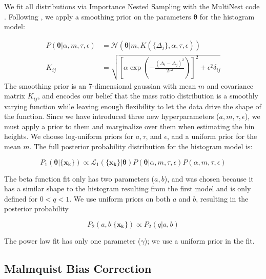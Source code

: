 \documentclass{emulateapj}
\renewcommand{\vec}[1]{\bm{#1}}
\DeclareMathOperator\erf{erf}
\begin{document}

We fit all distributions via Importance Nested Sampling with the MultiNest code \citep{multinest}. Following \citet{Foreman2014}, we apply a smoothing prior on the parameters $\vec{\theta}$ for the histogram model:

\begin{align}
P(\vec{\theta}| \alpha, m, \tau, \epsilon) &= \mathcal{N}(\vec{\theta} | m, K(\{\Delta_j\}, \alpha, \tau, \epsilon)) \\
K_{ij} &= \sqrt{\left[\alpha \exp{\left(-\frac{(\Delta_i - \Delta_j)^2}{2\tau^2}\right)}\right]^2 + \epsilon^2 \delta_{ij}}
\end{align}
The smoothing prior is an 7-dimensional gaussian with mean $m$ and covariance matrix $K_{ij}$, and encodes our belief that the mass ratio distribution is a smoothly varying function while leaving enough flexibility to let the data drive the shape of the function. Since we have introduced three new hyperparameters ($a, m, \tau, \epsilon$), we must apply a prior to them and marginalize over them when estimating the bin heights. We choose log-uniform priors for $a, \tau$, and $\epsilon$, and a uniform prior for the mean $m$. The full posterior probability distribution for the histogram model is:

\begin{equation}
P_1(\vec{\theta} | \{\vec{x_k}\}) \propto \mathcal{L}_1(\{\vec{x_k}\}| \vec{\theta}) P(\vec{\theta}| \alpha, m, \tau, \epsilon) P(\alpha, m, \tau, \epsilon)
\end{equation}

The beta function fit only has two parameters ($a, b$), and was chosen because it has a similar shape to the histogram resulting from the first model and is only defined for $0 < q < 1$. We use uniform priors on both $a$ and $b$, resulting in the posterior probability 

\begin{equation}
P_2(a, b | \{\vec{x_k}\}) \propto P_2(q|a, b) 
\end{equation}

The power law fit has only one parameter ($\gamma$); we use a uniform prior in the fit.

\subsection{Malmquist Bias Correction}
\end{document}
